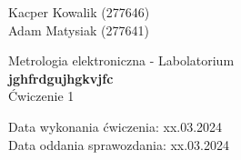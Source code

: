 \begin{flushright}
    Kacper Kowalik (277646) \\
    Adam Matysiak (277641)
\end{flushright}

\vspace{30px}

\begin{center}
    Metrologia elektroniczna - Labolatorium \\
    \vspace{15px}
    {\Large{\textbf{jghfrdgujhgkvjfc}}} \\
    \vspace{15px}
    Ćwiczenie 1 \\
\end{center}

\begin{flushright}
    Data wykonania ćwiczenia: xx.03.2024 \\
    Data oddania sprawozdania: xx.03.2024
\end{flushright}